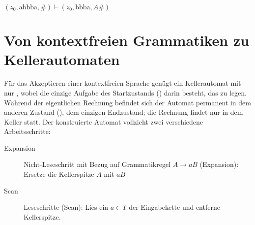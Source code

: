 \documentclass{bschlangaul-theorie}
\begin{document}
\begin{center}
$(z_0, \text{abbba}, \# ) \vdash (z_0, \text{bbba}, A\#)$
\end{center}

\section{Von kontextfreien Grammatiken zu Kellerautomaten}

Für das Akzeptieren einer kontextfreien Sprache genügt ein Kellerautomat
mit nur , wobei die einzige Aufgabe des
Startzustands () darin besteht, das  zu legen. Während der eigentlichen Rechnung
befindet sich der Automat permanent in dem anderen Zustand (), dem
einzigen Endzustand; die Rechnung findet nur in dem Keller statt. Der
konstruierte Automat vollzieht zwei verschiedene Arbeitsschritte:

\begin{description}
\item[Expansion]

Nicht-Leseschritt mit Bezug auf Grammatikregel $A \rightarrow a B$
(Expansion): Ersetze die Kellerspitze $A$ mit $a B$

\item[Scan]

Leseschritte (Scan): Lies ein $a \in T$  der Eingabekette und entferne
Kellerspitze.
\end{description}


\literatur
\end{document}
